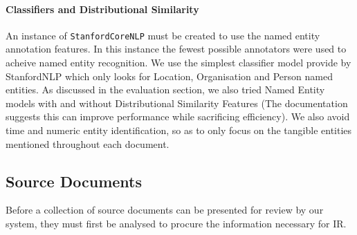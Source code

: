\documentclass{l4proj}
\newcommand{\code}[1]{\texttt{#1}}
\begin{document}
\paragraph{Classifiers and Distributional Similarity} \label{classifiers}
An instance of \code{StanfordCoreNLP} must be created to use the named entity annotation features.
In this instance the fewest possible annotators were used to acheive named entity recognition.
We use the simplest classifier model provide by StanfordNLP which only looks for Location, Organisation and Person named entities.
As discussed in the evaluation section, we also tried Named Entity models with and without Distributional Similarity Features (The documentation suggests this can improve performance while sacrificing efficiency).
We also avoid time and numeric entity identification, so as to only focus on the tangible entities mentioned throughout each document.

\subsection{Source Documents}
Before a collection of source documents can be presented for review by our system, they must first be analysed to procure the information necessary for IR.
\end{document}
